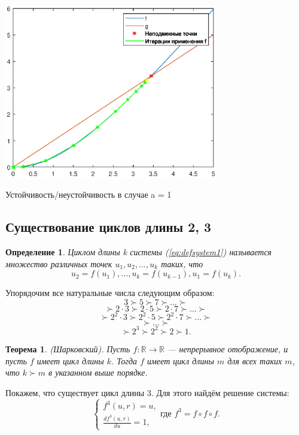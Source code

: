 \documentclass[12pt]{article}
\newtheorem{theorem}{Теорема}
\newtheorem{definition}{Определение}
\begin{document}
\begin{enumerate}
    \begin{center}
        \includegraphics[width=0.7\textwidth]{stability.eps}
        \caption{Устойчивость/неустойчивость в случае a = 1}
        \label{pic4}
    \end{center}
\end{enumerate}

\newpage
\subsection{Существование циклов длины 2, 3}
\begin{definition}
\textit{Циклом длины k} системы (\ref{eq:defsystem1}) называется множество различных точек $u_1, u_2, ..., u_k$ таких, что
$$
    u_2 = f(u_1), ..., u_k = f(u_{k-1}), u_1 = f(u_k).
$$
\end{definition}
Упорядочим все натуральные числа следующим образом:
$$
    3 \succ 5 \succ 7 \succ ... \succ
$$
$$
    \succ 2\cdot 3 \succ 2 \cdot 5 \succ 2 \cdot 7 \succ ... \succ
$$
$$
    \succ 2^2\cdot 3 \succ 2^2 \cdot 5 \succ 2^2 \cdot 7 \succ ... \succ
$$
$$
    \succ ... \succ
$$
$$
    \succ 2^3 \succ 2^2 \succ 2 \succ 1.
$$
\begin{theorem}
    (Шарковский). Пусть $f:\mathbb{R} \rightarrow \mathbb{R}$ — непрерывное отображение, и пусть $f$ имеет цикл длины $k$. Тогда $f$ имеет цикл длины $m$ для всех таких $m$, что $k \succ m$ в указанном выше порядке. \label{th1}
\end{theorem}
Покажем, что существует цикл длины 3. Для этого найдём решение системы:
\begin{equation}
    \begin{cases}
        f^3(u,r) = u, \\
        \frac{df^3(u,r)}{du} = 1, 
    \end{cases}
    \text{где } f^3 = f \circ f \circ f.
\end{equation}
\end{document}
